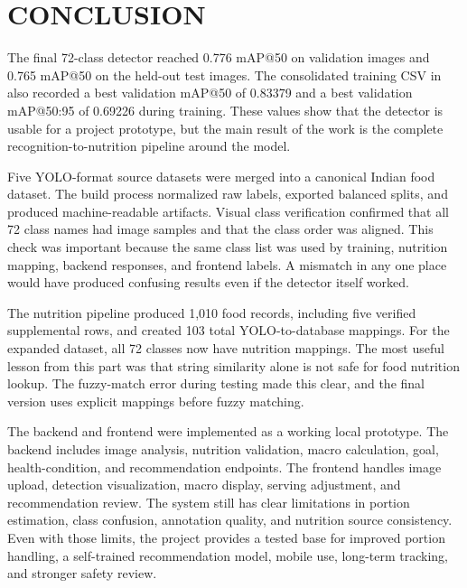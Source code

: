 \chapter{CONCLUSION}

The final 72-class detector reached 0.776 mAP@50 on validation images and 0.765 mAP@50 on the held-out test images. The consolidated training CSV in  also recorded a best validation mAP@50 of 0.83379 and a best validation mAP@50:95 of 0.69226 during training. These values show that the detector is usable for a project prototype, but the main result of the work is the complete recognition-to-nutrition pipeline around the model.

Five YOLO-format source datasets were merged into a canonical Indian food dataset. The build process normalized raw labels, exported balanced splits, and produced machine-readable artifacts. Visual class verification confirmed that all 72 class names had image samples and that the class order was aligned. This check was important because the same class list was used by training, nutrition mapping, backend responses, and frontend labels. A mismatch in any one place would have produced confusing results even if the detector itself worked.

The nutrition pipeline produced 1,010 food records, including five verified supplemental rows, and created 103 total YOLO-to-database mappings. For the expanded dataset, all 72 classes now have nutrition mappings. The most useful lesson from this part was that string similarity alone is not safe for food nutrition lookup. The  fuzzy-match error during testing made this clear, and the final version uses explicit mappings before fuzzy matching.

The backend and frontend were implemented as a working local prototype. The backend includes image analysis, nutrition validation, macro calculation, goal, health-condition, and recommendation endpoints. The frontend handles image upload, detection visualization, macro display, serving adjustment, and recommendation review. The system still has clear limitations in portion estimation, class confusion, annotation quality, and nutrition source consistency. Even with those limits, the project provides a tested base for improved portion handling, a self-trained recommendation model, mobile use, long-term tracking, and stronger safety review.
